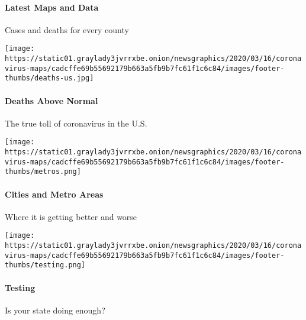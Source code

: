 \hypertarget{latest-maps-and-data}{%
\paragraph{Latest Maps and Data}\label{latest-maps-and-data}}

Cases and deaths for every county

\href{https://www.nytimes3xbfgragh.onion/interactive/2020/05/05/us/coronavirus-death-toll-us.html}{}

\texttt{[image: https://static01.graylady3jvrrxbe.onion/newsgraphics/2020/03/16/coronavirus-maps/cadcffe69b55692179b663a5fb9b7fc61f1c6c84/images/footer-thumbs/deaths-us.jpg]}

\hypertarget{deaths-above-normal}{%
\paragraph{Deaths Above Normal}\label{deaths-above-normal}}

The true toll of coronavirus in the U.S.

\href{https://www.nytimes3xbfgragh.onion/interactive/2020/04/23/upshot/five-ways-to-monitor-coronavirus-outbreak-us.html}{}

\texttt{[image: https://static01.graylady3jvrrxbe.onion/newsgraphics/2020/03/16/coronavirus-maps/cadcffe69b55692179b663a5fb9b7fc61f1c6c84/images/footer-thumbs/metros.png]}

\hypertarget{cities-and-metro-areas}{%
\paragraph{Cities and Metro Areas}\label{cities-and-metro-areas}}

Where it is getting better and worse

\href{https://www.nytimes3xbfgragh.onion/interactive/2020/us/coronavirus-testing.html}{}

\texttt{[image: https://static01.graylady3jvrrxbe.onion/newsgraphics/2020/03/16/coronavirus-maps/cadcffe69b55692179b663a5fb9b7fc61f1c6c84/images/footer-thumbs/testing.png]}

\hypertarget{testing}{%
\paragraph{Testing}\label{testing}}

Is your state doing enough?

\href{https://www.nytimes3xbfgragh.onion/interactive/2020/us/coronavirus-nursing-homes.html}{}

